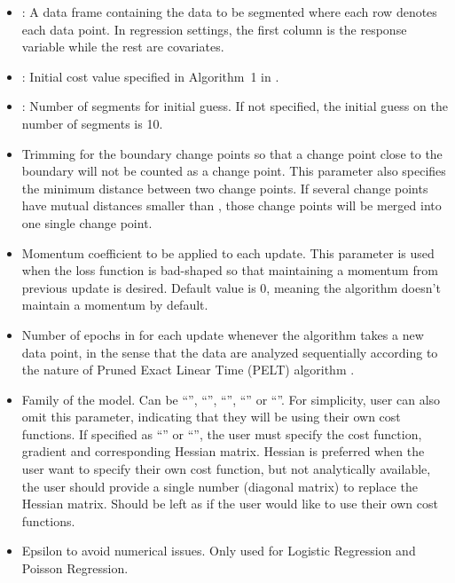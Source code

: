 \documentclass[article]{jss}\usepackage[]{graphicx}\usepackage[]{xcolor}
\begin{document}
\begin{itemize}
  \item {}: A data frame containing the data to be segmented where each
    row denotes each data point. In regression settings, the first column is the
    response variable while the rest are covariates.
  \item {}: Initial cost value specified in Algorithm~1 in
    \cite{zhang2022sequential}.
  \item {}: Number of segments for initial guess. If not
    specified, the initial guess on the number of segments is 10.
  \item {} Trimming for the boundary change points so that a change
    point close to the boundary will not be counted as a change point. This
    parameter also specifies the minimum distance between two change points. If
    several change points have mutual distances smaller than
    , those change points will be merged into one single
    change point.
  \item {} Momentum coefficient to be applied to each update.
    This parameter is used when the loss function is bad-shaped so that
    maintaining a momentum from previous update is desired. Default value is 0,
    meaning the algorithm doesn't maintain a momentum by default.
  \item {} Number of epochs in for each update whenever the algorithm
    takes a new data point, in the sense that the data are analyzed sequentially
    according to the nature of Pruned Exact Linear Time (PELT) algorithm
    \citep{killick2012optimal}.
  \item {} Family of the model. Can be ``'', ``'',
    ``'', ``'' or ``''. For simplicity,
    user can also omit this parameter, indicating that they will be using their
    own cost functions. If specified as ``'' or ``'', the user must
    specify the cost function, gradient and corresponding Hessian matrix.
    Hessian is preferred when the user want to specify their own cost function,
    but not analytically available, the user should provide a single number
    (diagonal matrix) to replace the Hessian matrix. Should be left as
     if the user would like to use their own cost functions.
  \item {} Epsilon to avoid numerical issues. Only used for Logistic
    Regression and Poisson Regression.

\end{itemize}
\end{document}
